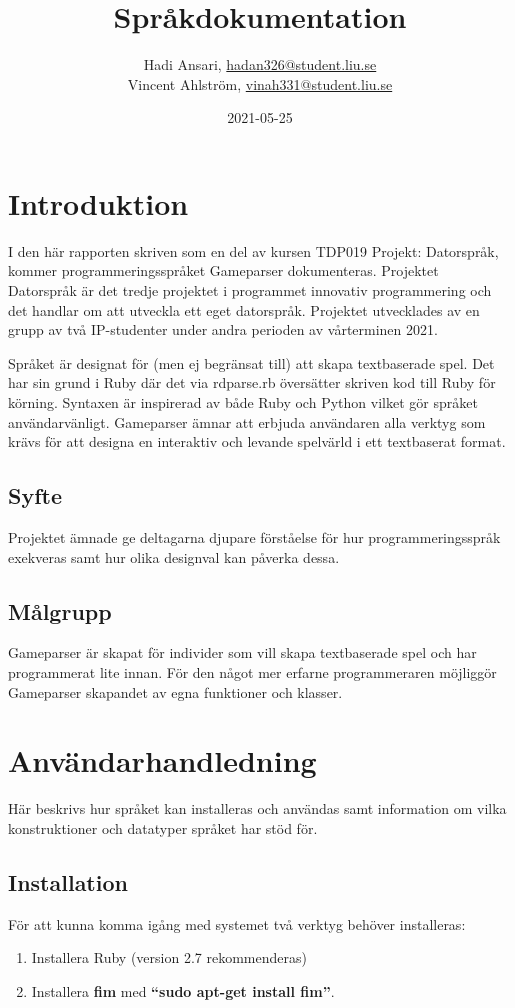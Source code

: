 \documentclass{Dokumentmall}
\author{Hadi Ansari, \url{hadan326@student.liu.se}\\
  Vincent Ahlström, \url{vinah331@student.liu.se}}
\title{Språkdokumentation}
\date{2021-05-25}
\begin{document}
\projectpage
\tableofcontents
\thispagestyle{empty}
\cleardoublepage
\setcounter{page}{1}
\section{Introduktion}
I den här rapporten skriven som en del av kursen TDP019 Projekt: Datorspråk, kommer programmeringsspråket Gameparser dokumenteras. Projektet Datorspråk är det tredje projektet i programmet innovativ programmering och det handlar om att utveckla ett eget datorspråk. Projektet utvecklades av en grupp av två IP-studenter under andra perioden av vårterminen 2021.

Språket är designat för (men ej begränsat till) att skapa textbaserade spel. Det har sin grund i Ruby där det via rdparse.rb översätter skriven kod till Ruby för körning. Syntaxen är inspirerad av både Ruby och Python vilket gör språket användarvänligt. Gameparser ämnar att erbjuda användaren alla verktyg som krävs för att designa en interaktiv och levande spelvärld i ett textbaserat format.

\subsection{Syfte}
Projektet ämnade ge deltagarna djupare förståelse för hur programmeringsspråk exekveras samt hur olika designval kan påverka dessa.

\subsection{Målgrupp}
Gameparser är skapat för individer som vill skapa textbaserade spel och har programmerat lite innan. För den något mer erfarne programmeraren möjliggör Gameparser skapandet av egna funktioner och klasser.

\newpage
\section{Användarhandledning}
Här beskrivs hur språket kan installeras och användas samt information om vilka konstruktioner och  datatyper språket har stöd för.

\subsection{Installation}
För att kunna komma igång med systemet två verktyg behöver installeras:
\begin{enumerate}  
\item Installera Ruby (version 2.7 rekommenderas)
\item Installera \textbf{fim} med \textbf{``sudo apt-get install fim''}.
\end{enumerate}
\end{document}
